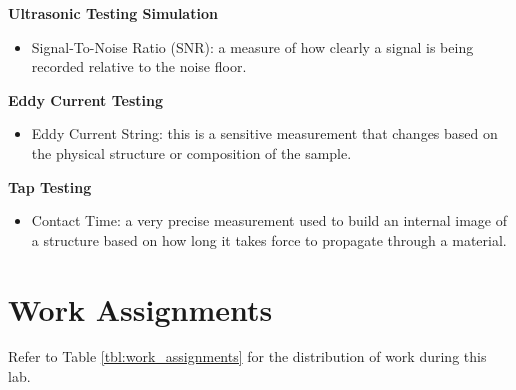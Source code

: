 \documentclass[12 pt]{report}
\begin{document}
\textbf{Ultrasonic Testing Simulation}

\begin{itemize}
	\item Signal-To-Noise Ratio (SNR): a measure of how clearly a signal is being recorded relative to the noise floor.
\end{itemize}

\textbf{Eddy Current Testing}

\begin{itemize}
	\item Eddy Current String: this is a sensitive measurement that changes based on the physical structure or composition of the sample.
\end{itemize}

\textbf{Tap Testing}

\begin{itemize}
	\item Contact Time: a very precise measurement used to build an internal image of a structure based on how long it takes force to propagate through a material.
\end{itemize} 

\section{Work Assignments} \label{work_assignments}
Refer to Table \ref{tbl:work_assignments} for the distribution of work during this lab.
\end{document}
